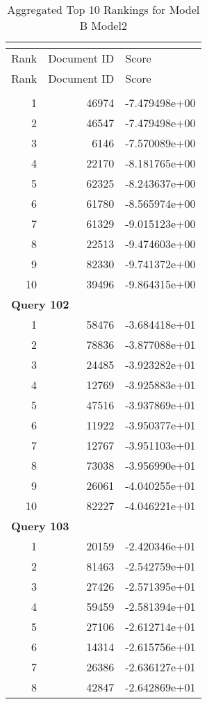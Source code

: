 \begin{longtable}[{p}]{@{}rrp{}@{}}
\caption{Aggregated Top 10 Rankings for Model B Model2} {\label{tab:aggregated_BModel2}}\\
\toprule
Rank & Document ID & Score \\
\midrule
\endfirsthead
\toprule
Rank & Document ID & Score \\
\midrule
\endhead
\endfoot
\bottomrule
\endlastfoot
\multicolumn{3}{l}{\bfseries Query 101} \\
1 & 46974 & -7.479498e+00 \\
2 & 46547 & -7.479498e+00 \\
3 & 6146 & -7.570089e+00 \\
4 & 22170 & -8.181765e+00 \\
5 & 62325 & -8.243637e+00 \\
6 & 61780 & -8.565974e+00 \\
7 & 61329 & -9.015123e+00 \\
8 & 22513 & -9.474603e+00 \\
9 & 82330 & -9.741372e+00 \\
10 & 39496 & -9.864315e+00 \\
\midrule
\multicolumn{3}{l}{\bfseries Query 102} \\
1 & 58476 & -3.684418e+01 \\
2 & 78836 & -3.877088e+01 \\
3 & 24485 & -3.923282e+01 \\
4 & 12769 & -3.925883e+01 \\
5 & 47516 & -3.937869e+01 \\
6 & 11922 & -3.950377e+01 \\
7 & 12767 & -3.951103e+01 \\
8 & 73038 & -3.956990e+01 \\
9 & 26061 & -4.040255e+01 \\
10 & 82227 & -4.046221e+01 \\
\midrule
\multicolumn{3}{l}{\bfseries Query 103} \\
1 & 20159 & -2.420346e+01 \\
2 & 81463 & -2.542759e+01 \\
3 & 27426 & -2.571395e+01 \\
4 & 59459 & -2.581394e+01 \\
5 & 27106 & -2.612714e+01 \\
6 & 14314 & -2.615756e+01 \\
7 & 26386 & -2.636127e+01 \\
8 & 42847 & -2.642869e+01 \\

\end{longtable}
